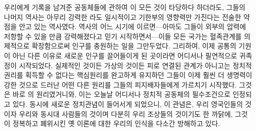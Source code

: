 우리에게 기록을 남겨준 공동체들에 관하여
이 모든 것이
타당하다 하더라도, 그들의 나머지 역사는
아무리 강력한 라도 일시적이고 기한부의 영향력만 가진다는
전술한 약점을 안고 있는 역사였다.
역사의 어느 시기에 이르면---아마도 그들이 외부의 압력에 저항할 수 있을 만큼
강력해졌다고 믿기 시작하면서---이들 모든 국가는
혈족관계를 의제적으로 확장함으로써 인구를 충원하는 일을 그만두었다.
그리하여,
이제 공통의 기원이 아닌 다른 이유로 새로운 인구를 끌어들이게 된 곳이라면
어디서나 필연적으로 귀족정이 시작되었다.
실제적인 것이든 가상의 것이든
피로 연결된 관계가 아니고는 정치적 권리를 획득할 수 없다는
핵심원리를 완고하게 유지하던 그들이 이제
훨씬 더 생명력이 강한 것으로 드러난
어떤 다른 원리를
그들의 피지배자들에게
가르치기 시작했다.
그것은 바로 의 원리였거니와,
이는 오늘날 어디서나 정치적 공동체의 필수조건으로 인정되고 있다.
동시에 새로운 정치관념이 들어서게 되었으니,
이 관념은,
우리 영국인들의 것이자 우리와 동시대 사람들의 것이며
다분히 우리 조상들의 것이기도 한 까닭에,
그것이 정복하고 폐위시킨 옛 이론에 대한 우리의 인식을 다소간
방해하고 있다.

